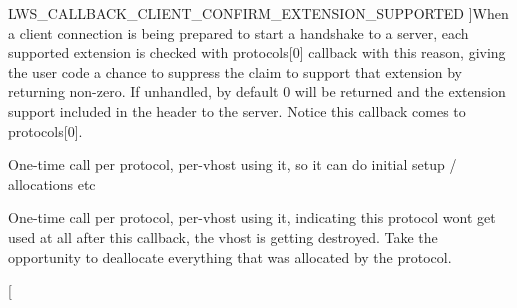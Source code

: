 \begin{Desc}
\begin{description}
{L\+W\+S\+\_\+\+C\+A\+L\+L\+B\+A\+C\+K\+\_\+\+C\+L\+I\+E\+N\+T\+\_\+\+C\+O\+N\+F\+I\+R\+M\+\_\+\+E\+X\+T\+E\+N\+S\+I\+O\+N\+\_\+\+S\+U\+P\+P\+O\+R\+T\+ED\hypertarget{group__usercb_ggad62860e19975ba4c4af401c3cdb6abf7a1ce5b22039ca37ee224d00047596ea46}{}\label{group__usercb_ggad62860e19975ba4c4af401c3cdb6abf7a1ce5b22039ca37ee224d00047596ea46}
}]When a client connection is being prepared to start a handshake to a server, each supported extension is checked with protocols\mbox{[}0\mbox{]} callback with this reason, giving the user code a chance to suppress the claim to support that extension by returning non-\/zero. If unhandled, by default 0 will be returned and the extension support included in the header to the server. Notice this callback comes to protocols\mbox{[}0\mbox{]}. \item[{\em 
L\+W\+S\+\_\+\+C\+A\+L\+L\+B\+A\+C\+K\+\_\+\+P\+R\+O\+T\+O\+C\+O\+L\+\_\+\+I\+N\+IT\hypertarget{group__usercb_ggad62860e19975ba4c4af401c3cdb6abf7ad5d34583e3556e153eda91620b48cc49}{}\label{group__usercb_ggad62860e19975ba4c4af401c3cdb6abf7ad5d34583e3556e153eda91620b48cc49}
}]One-\/time call per protocol, per-\/vhost using it, so it can do initial setup / allocations etc \item[{\em 
L\+W\+S\+\_\+\+C\+A\+L\+L\+B\+A\+C\+K\+\_\+\+P\+R\+O\+T\+O\+C\+O\+L\+\_\+\+D\+E\+S\+T\+R\+OY\hypertarget{group__usercb_ggad62860e19975ba4c4af401c3cdb6abf7a54269ca88508e6efd3afdb9d360a9caa}{}\label{group__usercb_ggad62860e19975ba4c4af401c3cdb6abf7a54269ca88508e6efd3afdb9d360a9caa}
}]One-\/time call per protocol, per-\/vhost using it, indicating this protocol won\textquotesingle{}t get used at all after this callback, the vhost is getting destroyed. Take the opportunity to deallocate everything that was allocated by the protocol. \item[{\em 
}
\end{description}
\end{Desc}
